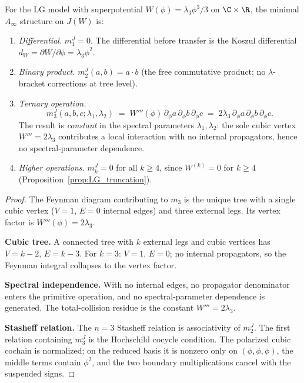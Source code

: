 \begin{computation}
\label{comp:lg-m3-explicit}
For the LG model with superpotential \(W(\phi)=\lambda_3\phi^3/3\) on
\(\C\times\R\), the minimal \(A_\infty\) structure on \(J(W)\) is:
\begin{enumerate}[label=(\roman*)]
\item \emph{Differential.}
 \(m_1^{J}=0\). The differential before transfer is the Koszul
 differential \(d_W=\partial W/\partial\phi=\lambda_3\phi^2\).

\item \emph{Binary product.}
 \(m_2^{J}(a,b)=a\cdot b\) (the free commutative product; no $\lambda$-bracket
 corrections at tree level).

\item \emph{Ternary operation.}
 \begin{equation}\label{eq:lg-m3-evaluated}
 m_3^{J}(a,b,c;\lambda_1,\lambda_2)
 \;=\; W'''(\phi)\,\partial_\phi a\,\partial_\phi b\,\partial_\phi c
 \;=\; 2\lambda_3\,\partial_\phi a\,\partial_\phi b\,\partial_\phi c.
 \end{equation}
 The result is \emph{constant} in the spectral parameters $\lambda_1,\lambda_2$:
 the sole cubic vertex $W'''=2\lambda_3$ contributes a local interaction with no
 internal propagators, hence no spectral-parameter dependence.

\item \emph{Higher operations.}
 \(m_k^{J}=0\) for all \(k\geq4\), since \(W^{(k)}=0\) for \(k\geq4\)
 (Proposition~\ref{prop:LG_truncation}).
\end{enumerate}
\end{computation}

\begin{proof}
The Feynman diagram contributing to $m_3$ is the unique tree with a single cubic vertex ($V=1$, $E=0$ internal edges) and three external legs. Its vertex factor is $W'''(\phi)=2\lambda_3$.

\textbf{Cubic tree.}
A connected tree with $k$ external legs and cubic vertices has $V = k-2$, $E = k-3$. For $k=3$: $V=1$, $E=0$; no internal propagators, so the Feynman integral collapses to the vertex factor.

\textbf{Spectral independence.}
With no internal edges, no propagator denominator enters the primitive
operation, and no spectral-parameter dependence is generated. The
total-collision residue is the constant \(W'''=2\lambda_3\).

\textbf{Stasheff relation.}
The \(n=3\) Stasheff relation is associativity of \(m_2^{J}\).
The first relation containing \(m_3^{J}\) is the Hochschild cocycle
condition. The polarized cubic cochain is normalized; on the reduced
basis it is nonzero only on \((\phi,\phi,\phi)\), the middle terms
contain \(\phi^2\), and the two boundary multiplications cancel with
the suspended signs.
\end{proof}

